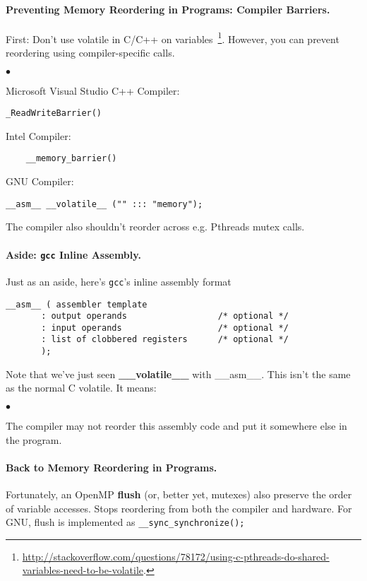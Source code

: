 \documentclass[11pt]{article}
\newcommand{\squishlist}{
 \begin{list}{$\bullet$}
  { \setlength{\itemsep}{0pt}
     \setlength{\parsep}{3pt}
     \setlength{\topsep}{3pt}
     \setlength{\partopsep}{0pt}
     \setlength{\leftmargin}{1.5em}
     \setlength{\labelwidth}{1em}
     \setlength{\labelsep}{0.5em} } }
\newcommand{\squishend}{
  \end{list}  }
\begin{document}
\paragraph{Preventing Memory Reordering in Programs: Compiler Barriers.}
First: Don't use volatile in C/C++ on variables~\footnote{\tiny \url{http://stackoverflow.com/questions/78172/using-c-pthreads-do-shared-variables-need-to-be-volatile}.}. However, you can prevent reordering using compiler-specific calls.

\squishlist
  \item Microsoft Visual Studio C++ Compiler:
  \begin{lstlisting}
_ReadWriteBarrier()
  \end{lstlisting}
  \item Intel Compiler:
  \begin{lstlisting}
    __memory_barrier()
  \end{lstlisting}
  \item GNU Compiler:
  \begin{lstlisting}
__asm__ __volatile__ ("" ::: "memory");
  \end{lstlisting}
\squishend

The compiler also shouldn't reorder across e.g. Pthreads mutex calls.

\paragraph{Aside: {\tt gcc} Inline Assembly.}
Just as an aside, here's {\tt gcc}'s inline assembly format

  \begin{lstlisting}
__asm__ ( assembler template 
       : output operands                  /* optional */
       : input operands                   /* optional */
       : list of clobbered registers      /* optional */
       );
  \end{lstlisting}

Note that we've just seen {\bf \_\_volatile\_\_} with  \_\_asm\_\_. This isn't the same as the normal C volatile. It means:
\squishlist
    \item The compiler may not reorder this assembly code and put it somewhere
      else in the program.
\squishend

\paragraph{Back to Memory Reordering in Programs.}
    Fortunately, an OpenMP {\bf flush} (or, better yet, mutexes) also preserve the order of variable accesses.
    Stops reordering from both the compiler and hardware.
    For GNU, flush is implemented as
      {\tt \_\_sync\_synchronize();}
\end{document}
